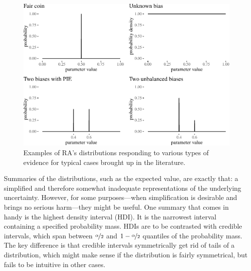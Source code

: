 \documentclass[
  10pt,
  dvipsnames,enabledeprecatedfontcommands]{scrartcl}
\begin{document}
\begin{figure}


\begin{center}\includegraphics[width=1\linewidth]{imprecision_weight_files/figure-latex/fig:evidenceResponse-1} \end{center}
\caption{Examples of RA's distributions responding to various types of evidence for typical cases brought up in the literature.}



\label{fig:evidenceResponse}
\end{figure}

Summaries of the distributions, such as the expected value, are exactly
that: a simplified and therefore somewhat inadequate representations of
the underlying uncertainty. However, for some purposes---when
simplification is desirable and brings no serious harm---they might be
useful. One summary that comes in handy is the highest density interval
(HDI). It is the narrowest interval containing a specified probability
mass. HDIs are to be contrasted with credible intervals, which span
between \(\nicefrac{\alpha}{2}\) and \(1-\nicefrac{\alpha}{2}\)
quantiles of the probability mass. The key difference is that credible
intervals symmetrically get rid of tails of a distribution, which might
make sense if the distribution is fairly symmetrical, but fails to be
intuitive in other cases.
\end{document}
